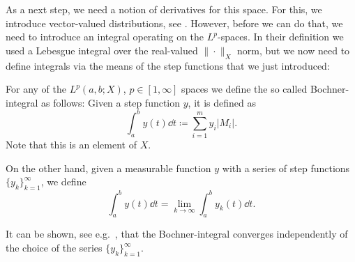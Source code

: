 \documentclass[../thesis.tex]{subfiles}
\begin{document}
As a next step, we need a notion of derivatives for this space. For this, we introduce vector-valued distributions, see \cite[p.\ 117]{Troeltzsch}.
However, before we can do that, we need to introduce an integral operating on the $L^p$-spaces.
In their definition we used a Lebesgue integral over the real-valued $\| \cdot \|_X$ norm, but we now need to define integrals via the means of the step functions that we just introduced:
\begin{definition}
For any of the $L^p(a, b; X)$, $p \in [1, \infty]$ spaces we define the so called Bochner-integral as follows:
Given a step function $y$, it is defined as
\[
	\int_a^b y(t) \dd t \coloneqq \sum_{i=1}^m y_i |M_i|.
\]
Note that this is an element of $X$.

On the other hand, given a measurable function $y$ with a series of step functions $\{ y_k\}_{k=1}^\infty$, we define
\[
	\int_a^b y(t) \dd t = \lim_{k \to \infty} \int_a^b y_k(t) \dd t.
\]
\end{definition}
It can be shown, see e.g.\ \cite{HillePhillips}, that the Bochner-integral converges independently of the choice of the series $\{ y_k \}_{k=1}^\infty$.
\end{document}
